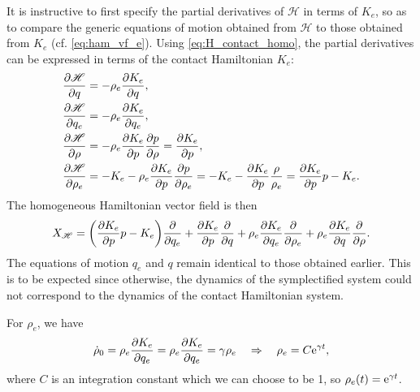 It is instructive to first specify the partial derivatives of \(\mathscr{H}\) in terms of \(K_e\), so as to compare the generic equations of motion obtained from \(\mathscr{H}\) to those obtained from \(K_e\) (cf. \cref{eq:ham_vf_e}). Using \cref{eq:H_contact_homo}, the partial derivatives can be expressed in terms of the contact Hamiltonian \(K_e\):
\begin{equation}
    \begin{split}
        \pdv{\mathscr{H}}{q} &= -\rho_e \pdv{K_e}{q}, \\
        \pdv{\mathscr{H}}{q_e} &= -\rho_e \pdv{K_e}{q_e}, \\
        \pdv{\mathscr{H}}{\rho} &= -\rho_e \pdv{K_e}{p}\pdv{p}{\rho} = \pdv{K_e}{p}, \\
        \pdv{\mathscr{H}}{\rho_e} &= -K_e - \rho_e \pdv{K_e}{p}\pdv{p}{\rho_e} = -K_e - \pdv{K_e}{p}\frac{\rho}{\rho_e} = \pdv{K_e}{p}p - K_e.\\
    \end{split}
\end{equation}
The homogeneous Hamiltonian vector field is then
\begin{equation}
    X_\mathscr{H} = \qty(\pdv{K_e}{p}p - K_e)\pdv{}{q_e}
                    + \pdv{K_e}{p}\pdv{}{q}
                    + \rho_e\pdv{K_e}{q_e}\pdv{}{\rho_e}
                    + \rho_e\pdv{K_e}{q}\pdv{}{\rho}.
    \label{eq:hom_ham_vf}
\end{equation}
The equations of motion \(q_e\) and \(q\) remain identical to those obtained earlier. This is to be expected since otherwise, the dynamics of the symplectified system could not correspond to the dynamics of the contact Hamiltonian system. 

For \(\rho_e\), we have
\begin{equation}
     \dot{\rho}_0 = \rho_e \pdv{K_e}{q_e} = \rho_e \pdv{K_e}{q_e}  = \gamma\rho_e \quad \Rightarrow \quad \rho_e = C\mathrm{e}^{\gamma t},
\end{equation} 
where \(C\) is an integration constant which we can choose to be 1, so \(\rho_e(t) = \mathrm{e}^{\gamma t}\).

